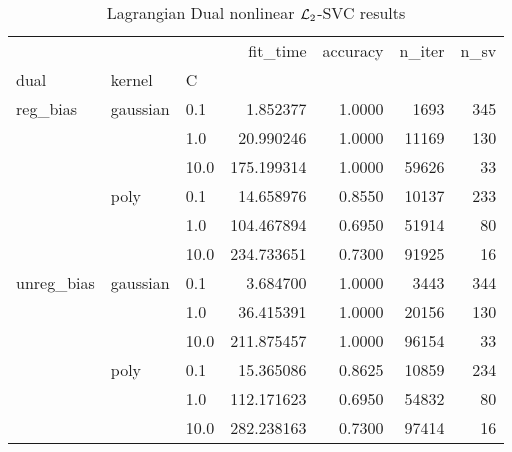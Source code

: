 \begin{table}[H]
\centering
\caption{Lagrangian Dual nonlinear $\protect \mathcal{L}_2$-SVC results}
\label{nonlinear_lagrangian_dual_l2_svc_cv_results}
\begin{tabular}{lllrrrr}
\toprule
           &      &      &    fit\_time &  accuracy &  n\_iter &  n\_sv \\
dual & kernel & C &             &           &         &       \\
\midrule
reg\_bias & gaussian & 0.1  &    1.852377 &    1.0000 &    1693 &   345 \\
           &      & 1.0  &   20.990246 &    1.0000 &   11169 &   130 \\
           &      & 10.0 &  175.199314 &    1.0000 &   59626 &    33 \\
           & poly & 0.1  &   14.658976 &    0.8550 &   10137 &   233 \\
           &      & 1.0  &  104.467894 &    0.6950 &   51914 &    80 \\
           &      & 10.0 &  234.733651 &    0.7300 &   91925 &    16 \\
unreg\_bias & gaussian & 0.1  &    3.684700 &    1.0000 &    3443 &   344 \\
           &      & 1.0  &   36.415391 &    1.0000 &   20156 &   130 \\
           &      & 10.0 &  211.875457 &    1.0000 &   96154 &    33 \\
           & poly & 0.1  &   15.365086 &    0.8625 &   10859 &   234 \\
           &      & 1.0  &  112.171623 &    0.6950 &   54832 &    80 \\
           &      & 10.0 &  282.238163 &    0.7300 &   97414 &    16 \\
\bottomrule
\end{tabular}
\end{table}
